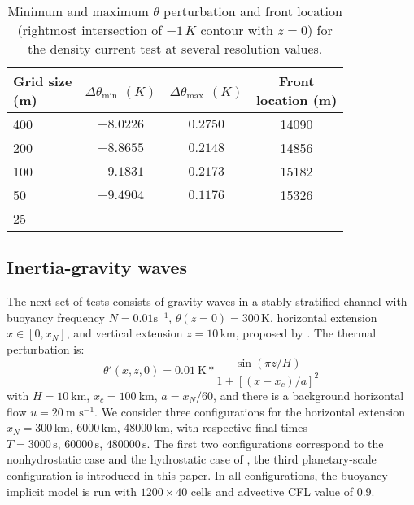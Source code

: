 \documentclass{ametsoc}
\theoremstyle{definition}
\begin{document}
\begin{table}
\small
\begin{centering}
\begin{tabular}{lccc}
\toprule 
\shortstack{Grid size \\ (m)}& \shortstack{$\Delta\theta_\textrm{min}$ \\ $(K)$} & \shortstack{$\Delta\theta_\textrm{max}$ \\ $(K)$} & \shortstack{Front\\ location (m)} \tabularnewline
\midrule 
400 &  $-8.0226$ & $ 0.2750$ & 14090\tabularnewline
200 &  $-8.8655$ & $0.2148$ & 14856\tabularnewline
100 &  $-9.1831$ & $0.2173$ & 15182\tabularnewline
50 &  $-9.4904$ & $0.1176$ & 15326\tabularnewline
25 &  &  & \tabularnewline
\bottomrule 
\end{tabular}
\par\end{centering}
\caption{Minimum and maximum $\theta$ perturbation and front location
(rightmost intersection of $-1\,K$ contour with $z=0$) for the density current test at several resolution values.}%
\label{tab:straka_minmax}
\end{table}


\subsection{Inertia-gravity waves} 

The next set of tests consists of gravity waves in a stably stratified channel with buoyancy frequency $N=0.01\textrm{s}^{-1}$, $\theta(z=0)=300\,\textrm{K}$, horizontal extension $x\in[0,x_N]$, and vertical extension $z=10\,\textrm{km}$, proposed by \cite{SkamarockKlemp1994}. The thermal perturbation is:
%
\begin{equation}
 \theta'(x, z, 0)=0.01~\textrm{K}*\dfrac{\sin(\pi z/H)}{1+[(x-x_c)/a]^2}\label{eq: init_theta_pert_igw} 
\end{equation} 
%
with $H=10~\textrm{km}$, $x_c=100~\textrm{km}$, $a=x_N/60$, and there is a background horizontal flow $u=20~\textrm{m s}^{-1}$. We consider three configurations for the horizontal extension $x_N=300\,\textrm{km},\,6000\,\textrm{km},\,48000\,\textrm{km}$, with respective final times $T=3000\,\textrm{s},\,60000\,\textrm{s},\,480000\,\textrm{s}$. The first two configurations correspond to the nonhydrostatic case and the hydrostatic case of \cite{SkamarockKlemp1994}, the third planetary-scale configuration is introduced in this paper. In all configurations, the buoyancy-implicit model is run with $1200\times40$ cells and advective CFL value of 0.9. 
\end{document}
